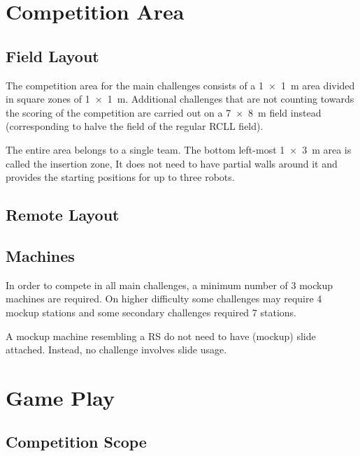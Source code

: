 \documentclass[12pt,twoside]{article}
\begin{document}
\section{Competition Area}
\subsection{Field Layout}
The competition area for the main challenges consists of a \SI{1 x 1}{\metre}
area divided in square zones of \SI{1 x 1}{\metre}. Additional challenges that
are not counting towards the scoring of the competition are carried out on
a \SI{7 x 8}{\metre} field instead (corresponding to halve the field of the
regular \ac{RCLL} field).


The entire area belongs to a single team. The bottom left-most
\SI{1 x 3}{\metre} area is called the insertion zone, It does not need to have
partial walls around it and provides the starting positions for up to three
robots.
\subsection{Remote Layout}
\subsection{Machines}

In order to compete in all main challenges, a minimum number of 3 mockup
machines are required. On higher difficulty some challenges may require
4 mockup stations and some secondary challenges required 7 stations.

A mockup machine resembling a \ac{RS} do not need to have (mockup) slide
attached. Instead, no challenge involves slide usage.
\section{Game Play}
\subsection{Competition Scope}
\end{document}
